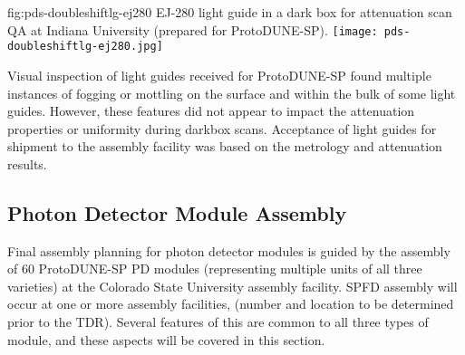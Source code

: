 \begin{dunefigure}{fig:pds-doubleshiftlg-ej280}
{EJ-280 light guide in a dark box for attenuation scan QA at Indiana University (prepared for ProtoDUNE-SP).}
  \texttt{[image: pds-doubleshiftlg-ej280.jpg]}
\end{dunefigure}

Visual inspection of light guides received for ProtoDUNE-SP found multiple instances of fogging or mottling on the surface and within the bulk of some light guides. However, these features did not appear to impact the attenuation properties or uniformity during darkbox scans. Acceptance of light guides for shipment to the assembly facility was based on the metrology and attenuation results.






\subsection{Photon Detector Module Assembly}

Final assembly planning for photon detector modules is guided by the assembly of \num{60} ProtoDUNE-SP PD modules (representing multiple units of all three varieties) at the Colorado State University assembly facility.  SPFD assembly will occur at one or more assembly facilities, (number and location to be determined prior to the TDR).  Several features of this are common to all three types of module, and these aspects will be covered in this section.

